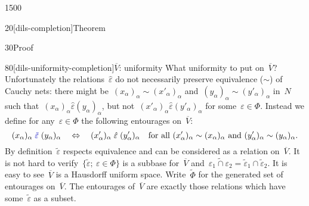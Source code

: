 \begin{parsec}{1500}
\begin{point}{20}[dils-completion]{Theorem}
\begin{point}{30}{Proof}
\begin{point}{80}[dils-uniformity-completion]{$\overline{V}$: uniformity}
What uniformity to put on~$\overline{V}$?
Unfortunately the relations~$\hat\varepsilon$ do not necessarily preserve
equivalence ($\sim$) of Cauchy nets:
    there might be~$(x_\alpha)_\alpha \sim (x'_\alpha)_\alpha$
    and~$(y_\alpha)_\alpha \sim (y'_\alpha)_\alpha$ in~$N$
such that~$(x_\alpha)_\alpha \mathrel{\hat\varepsilon} (y_\alpha)_\alpha$,
but not~$(x'_\alpha)_\alpha \mathrel{\hat\varepsilon} (y'_\alpha)_\alpha$
for some~$\varepsilon \in \Phi$.
Instead we define for any~$\varepsilon \in \Phi$
the following entourages on~$\overline{V}$:
\begin{equation*}
    (x_\alpha)_\alpha \mathrel{\Define{\tilde\varepsilon}\index{*epsiti@$\tilde\varepsilon$}}
    (y_\alpha)_\alpha \quad\Leftrightarrow\quad
    (x'_\alpha)_\alpha \mathrel{\hat\varepsilon}
    (y'_\alpha)_\alpha \quad
    \text{for all
        $(x'_\alpha)_\alpha \sim (x_\alpha)_\alpha$ 
    and $(y'_\alpha)_\alpha \sim (y_\alpha)_\alpha$.}
\end{equation*}
By definition~$\tilde\varepsilon$
respects equivalence and can be considered as a relation on~$\overline{V}$.
It is not hard to verify~$\{ \tilde\varepsilon ;\ \varepsilon \in \Phi\}$
is a subbase for~$\overline{V}$
and~$\widetilde{\varepsilon_1 \cap \varepsilon_2} = \tilde{\varepsilon}_1
\cap \tilde{\varepsilon}_2$.
It is easy to see~$\overline{V}$ is a Hausdorff uniform space.
Write~$\tilde\Phi$ for the generated set of entourages on~$\overline{V}$.
The entourages of~$\overline{V}$ are exactly those relations
    which have some~$\tilde\varepsilon$
    as a subset.


\end{point}
\end{point}
\end{point}
\end{parsec}
